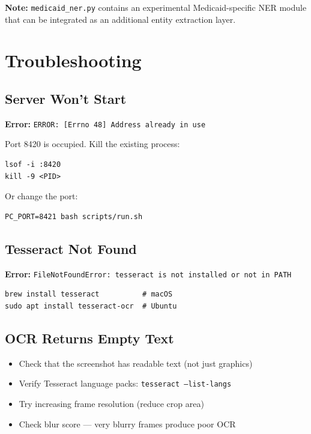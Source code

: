 \documentclass[12pt, a4paper]{article}
\newcommand{\codeinline}[1]{\texttt{\small\colorbox{codebg}{#1}}}
\newcommand{\filepath}[1]{\texttt{\small #1}}
\begin{document}
\textbf{Note:} \filepath{medicaid\_ner.py} contains an experimental Medicaid-specific NER module that can be integrated as an additional entity extraction layer.

\section{Troubleshooting}

\subsection{Server Won't Start}

\textbf{Error:} \codeinline{ERROR: [Errno 48] Address already in use}

Port 8420 is occupied. Kill the existing process:
\begin{lstlisting}[style=bash]
lsof -i :8420
kill -9 <PID>
\end{lstlisting}

Or change the port:
\begin{lstlisting}[style=bash]
PC_PORT=8421 bash scripts/run.sh
\end{lstlisting}

\subsection{Tesseract Not Found}

\textbf{Error:} \codeinline{FileNotFoundError: tesseract is not installed or not in PATH}

\begin{lstlisting}[style=bash]
brew install tesseract          # macOS
sudo apt install tesseract-ocr  # Ubuntu
\end{lstlisting}

\subsection{OCR Returns Empty Text}

\begin{itemize}
    \item Check that the screenshot has readable text (not just graphics)
    \item Verify Tesseract language packs: \codeinline{tesseract --list-langs}
    \item Try increasing frame resolution (reduce crop area)
    \item Check blur score --- very blurry frames produce poor OCR
\end{itemize}
\end{document}
